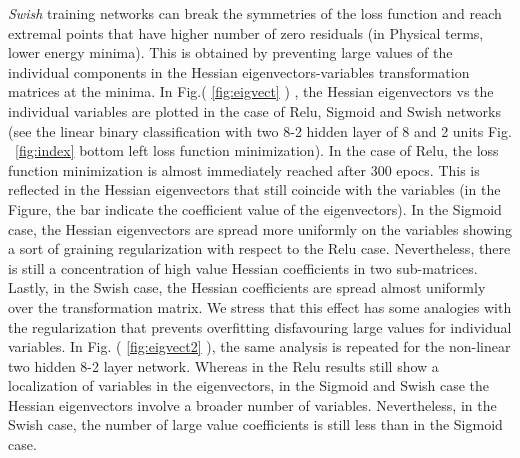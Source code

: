 \documentclass[5p]{elsarticle}
\begin{document}
  {\it Swish} training networks can break the symmetries of the loss function and reach extremal points that have higher number of zero residuals (in Physical terms, lower energy minima).
  This is obtained by preventing large values of the individual components in the Hessian eigenvectors-variables transformation matrices at the minima. In Fig.( \ref{fig:eigvect} ) , the Hessian eigenvectors vs the individual variables are plotted in the case of Relu, Sigmoid and Swish networks (see the linear binary classification with two 8-2 hidden layer of 8 and 2 units Fig. ~\eqref{fig:index} bottom left loss function minimization). In the case of Relu, the loss function minimization is almost immediately reached after 300 epocs. This is reflected in the Hessian eigenvectors that still coincide with the variables (in the Figure, the bar indicate the coefficient value of the eigenvectors). In the Sigmoid case, the Hessian eigenvectors are spread more uniformly on the variables showing a sort of graining regularization with respect to the Relu case. Nevertheless, there is still a concentration of high value Hessian coefficients in two sub-matrices. Lastly, in the Swish case, the Hessian coefficients are spread almost uniformly over the transformation matrix. We stress that this effect has some analogies with the regularization that prevents overfitting disfavouring large values for individual variables.   
  In Fig. ( \ref{fig:eigvect2} ), the same analysis is repeated for the non-linear two hidden 8-2 layer network. Whereas in the Relu results still show a localization of variables in the eigenvectors, in the Sigmoid and Swish case the Hessian eigenvectors involve a broader number of variables. Nevertheless, in the Swish case, the number of large value coefficients is still less than in the Sigmoid case.
%
\end{document}
